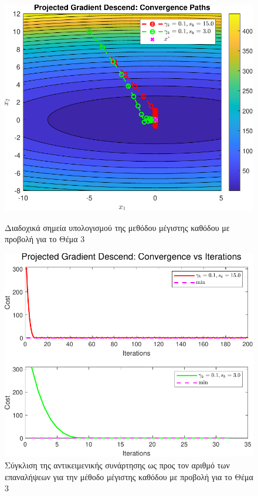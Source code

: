 \documentclass[a4paper,12pt]{article}
\begin{document}
\begin{figure}[h]
    \centering
    \begin{minipage}{0.47\textwidth}
        \centering
        \includegraphics[width=1\linewidth]{plot/task3_contour.pdf}
        \caption{\small Διαδοχικά σημεία υπολογισμού της μεθόδου μέγιστης καθόδου με προβολή για το Θέμα 3}
        \label{fig:task3_contour}
    \end{minipage} \hfill
    \begin{minipage}{0.47\textwidth}
        \centering
        \includegraphics[width=1\linewidth]{plot/task3_convergence.pdf}
        \caption{\small Σύγκλιση της αντικειμενικής συνάρτησης ως προς τον αριθμό των επαναλήψεων για την μέθοδο μέγιστης καθόδου με προβολή για το Θέμα 3}
        \label{fig:task3_convergence}
    \end{minipage}
\end{figure}
\end{document}
